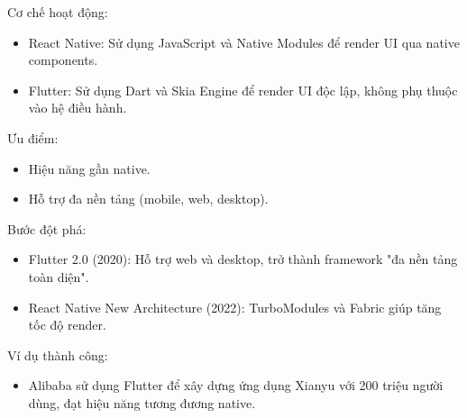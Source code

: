 \begin{flushleft}
        \begin{flushleft}
          \hspace*{0.8cm}Cơ chế hoạt động:
          \setlength{\leftmargini}{1.5cm}
          \begin{itemize}
              \item React Native: Sử dụng JavaScript và Native Modules để render UI qua native components.
              \item Flutter: Sử dụng Dart và Skia Engine để render UI độc lập, không phụ thuộc vào hệ điều hành.
          \end{itemize}
        \end{flushleft}

        \begin{flushleft}
          \hspace*{0.8cm}Ưu điểm:
          \setlength{\leftmargini}{1.5cm}
          \begin{itemize}
              \item Hiệu năng gần native.
              \item Hỗ trợ đa nền tảng (mobile, web, desktop).
          \end{itemize}
        \end{flushleft}

        \begin{flushleft}
          \hspace*{0.8cm}Bước đột phá:
          \setlength{\leftmargini}{1.5cm}
          \begin{itemize}
              \item Flutter 2.0 (2020): Hỗ trợ web và desktop, trở thành framework "đa nền tảng toàn diện".
              \item React Native New Architecture (2022): TurboModules và Fabric giúp tăng tốc độ render.
          \end{itemize}
        \end{flushleft}

        \begin{flushleft}
          \hspace*{0.8cm}Ví dụ thành công:
          \setlength{\leftmargini}{1.5cm}
          \begin{itemize}
              \item Alibaba sử dụng Flutter để xây dựng ứng dụng Xianyu với 200 triệu người dùng, đạt hiệu năng tương đương native.
          \end{itemize}
        \end{flushleft}
    \end{flushleft}

